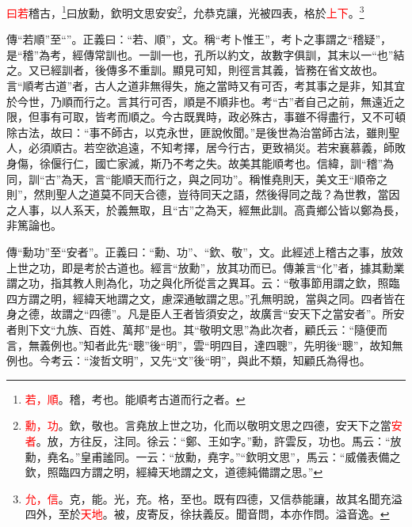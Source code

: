 \textcolor{red}{曰若}稽古，\footnote{\textcolor{red}{若，順}。稽，考也。能順考古道而行之者\textcolor{red}{}。}曰放勳，欽明文思安安\footnote{\textcolor{red}{勳，功}。欽，敬也。言堯放上世之功，化而以敬明文思之四德，安天下之當\textcolor{red}{安者}。放，方往反，注同。徐云：“鄭、王如字。”勳，許雲反，功也。馬云：“放勳，堯名。”皇甫謐同。一云：“放勳，堯字。”“欽明文思”，馬云：“威儀表備之欽，照臨四方謂之明，經緯天地謂之文，道德純備謂之思。”}，允恭克讓，光被四表，格於\textcolor{red}{上下}。\footnote{\textcolor{red}{允，信}。克，能。光，充。格，至也。既有四德，又信恭能讓，故其名聞充溢四外，至於\textcolor{red}{天地}。被，皮寄反，徐扶義反。聞音問，本亦作問。溢音逸。}

{\noindent\zhuan{}\fzbyks 傳“若順”至“”。正義曰：“若、順”，文。稱“考卜惟王”，考卜之事謂之“稽疑”，是“稽”為考，經傳常訓也。一訓一也，孔所以約文，故數字俱訓，其末以一“也”結之。又已經訓者，後傳多不重訓。顯見可知，則徑言其義，皆務在省文故也。言“順考古道”者，古人之道非無得失，施之當時又有可否，考其事之是非，知其宜於今世，乃順而行之。言其行可否，順是不順非也。考“古”者自己之前，無遠近之限，但事有可取，皆考而順之。今古既異時，政必殊古，事雖不得盡行，又不可頓除古法，故曰：“事不師古，以克永世，匪說攸聞。”是後世為治當師古法，雖則聖人，必須順古。若空欲追遠，不知考擇，居今行古，更致禍災。若宋襄慕義，師敗身傷，徐偃行仁，國亡家滅，斯乃不考之失。故美其能順考也。信緯，訓“稽”為同，訓“古”為天，言“能順天而行之，與之同功”。稱惟堯則天，美文王“順帝之則”，然則聖人之道莫不同天合德，豈待同天之語，然後得同之哉？為世教，當因之人事，以人系天，於義無取，且“古”之為天，經無此訓。高貴鄉公皆以鄭為長，非篤論也。 \par}

{\noindent\zhuan{}\fzbyks 傳“勳功”至“安者”。正義曰：“勳、功”、“欽、敬”，文。此經述上稽古之事，放效上世之功，即是考於古道也。經言“放勳”，放其功而已。傳兼言“化”者，據其勳業謂之功，指其教人則為化，功之與化所從言之異耳。云：“敬事節用謂之欽，照臨四方謂之明，經緯天地謂之文，慮深通敏謂之思。”孔無明說，當與之同。四者皆在身之德，故謂之“四德”。凡是臣人王者皆須安之，故廣言“安天下之當安者”。所安者則下文“九族、百姓、萬邦”是也。其“敬明文思”為此次者，顧氏云：“隨便而言，無義例也。”知者此先“聰”後“明”，雲“明四目，達四聰”，先明後“聰”，故知無例也。今考云：“浚哲文明”，又先“文”後“明”，與此不類，知顧氏為得也。 \par}

